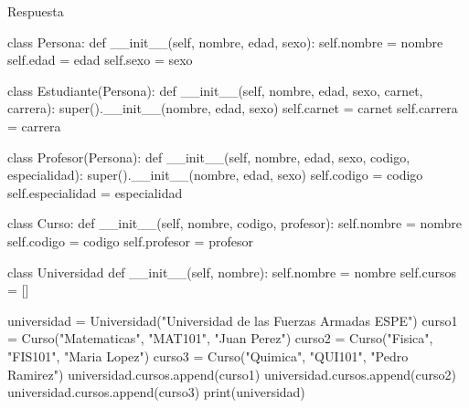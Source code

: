 \documentclass[
  a4paper,
  DIV=11,
  numbers=noendperiod,
  onepage,
  openany]{scrreprt}
\newenvironment{Shaded}{\begin{snugshade}}{\end{snugshade}}
\newcommand{\BuiltInTok}[1]{\textcolor[rgb]{0.00,0.23,0.31}{#1}}
\newcommand{\FunctionTok}[1]{\textcolor[rgb]{0.28,0.35,0.67}{#1}}
\newcommand{\KeywordTok}[1]{\textcolor[rgb]{0.00,0.23,0.31}{#1}}
\newcommand{\NormalTok}[1]{\textcolor[rgb]{0.00,0.23,0.31}{#1}}
\newcommand{\OperatorTok}[1]{\textcolor[rgb]{0.37,0.37,0.37}{#1}}
\newcommand{\StringTok}[1]{\textcolor[rgb]{0.13,0.47,0.30}{#1}}
\newcommand{\VariableTok}[1]{\textcolor[rgb]{0.07,0.07,0.07}{#1}}
\begin{document}
Respuesta

\begin{Shaded}
\begin{Highlighting}[]
\KeywordTok{class}\NormalTok{ Persona:}
    \KeywordTok{def} \FunctionTok{\_\_init\_\_}\NormalTok{(}\VariableTok{self}\NormalTok{, nombre, edad, sexo):}
        \VariableTok{self}\NormalTok{.nombre }\OperatorTok{=}\NormalTok{ nombre}
        \VariableTok{self}\NormalTok{.edad }\OperatorTok{=}\NormalTok{ edad}
        \VariableTok{self}\NormalTok{.sexo }\OperatorTok{=}\NormalTok{ sexo}

\KeywordTok{class}\NormalTok{ Estudiante(Persona):}
    \KeywordTok{def} \FunctionTok{\_\_init\_\_}\NormalTok{(}\VariableTok{self}\NormalTok{, nombre, edad, sexo, carnet, carrera):}
        \BuiltInTok{super}\NormalTok{().}\FunctionTok{\_\_init\_\_}\NormalTok{(nombre, edad, sexo)}
        \VariableTok{self}\NormalTok{.carnet }\OperatorTok{=}\NormalTok{ carnet}
        \VariableTok{self}\NormalTok{.carrera }\OperatorTok{=}\NormalTok{ carrera}

\KeywordTok{class}\NormalTok{ Profesor(Persona):}
    \KeywordTok{def} \FunctionTok{\_\_init\_\_}\NormalTok{(}\VariableTok{self}\NormalTok{, nombre, edad, sexo, codigo, especialidad):}
        \BuiltInTok{super}\NormalTok{().}\FunctionTok{\_\_init\_\_}\NormalTok{(nombre, edad, sexo)}
        \VariableTok{self}\NormalTok{.codigo }\OperatorTok{=}\NormalTok{ codigo}
        \VariableTok{self}\NormalTok{.especialidad }\OperatorTok{=}\NormalTok{ especialidad}

\KeywordTok{class}\NormalTok{ Curso:}
    \KeywordTok{def} \FunctionTok{\_\_init\_\_}\NormalTok{(}\VariableTok{self}\NormalTok{, nombre, codigo, profesor):}
        \VariableTok{self}\NormalTok{.nombre }\OperatorTok{=}\NormalTok{ nombre}
        \VariableTok{self}\NormalTok{.codigo }\OperatorTok{=}\NormalTok{ codigo}
        \VariableTok{self}\NormalTok{.profesor }\OperatorTok{=}\NormalTok{ profesor}

\KeywordTok{class}\NormalTok{ Universidad}
    \KeywordTok{def} \FunctionTok{\_\_init\_\_}\NormalTok{(}\VariableTok{self}\NormalTok{, nombre):}
        \VariableTok{self}\NormalTok{.nombre }\OperatorTok{=}\NormalTok{ nombre}
        \VariableTok{self}\NormalTok{.cursos }\OperatorTok{=}\NormalTok{ []}

\NormalTok{universidad }\OperatorTok{=}\NormalTok{ Universidad(}\StringTok{"Universidad de las Fuerzas Armadas ESPE"}\NormalTok{)}
\NormalTok{curso1 }\OperatorTok{=}\NormalTok{ Curso(}\StringTok{"Matematicas"}\NormalTok{, }\StringTok{"MAT101"}\NormalTok{, }\StringTok{"Juan Perez"}\NormalTok{)}
\NormalTok{curso2 }\OperatorTok{=}\NormalTok{ Curso(}\StringTok{"Fisica"}\NormalTok{, }\StringTok{"FIS101"}\NormalTok{, }\StringTok{"Maria Lopez"}\NormalTok{)}
\NormalTok{curso3 }\OperatorTok{=}\NormalTok{ Curso(}\StringTok{"Quimica"}\NormalTok{, }\StringTok{"QUI101"}\NormalTok{, }\StringTok{"Pedro Ramirez"}\NormalTok{)}
\NormalTok{universidad.cursos.append(curso1)}
\NormalTok{universidad.cursos.append(curso2)}
\NormalTok{universidad.cursos.append(curso3)}
\BuiltInTok{print}\NormalTok{(universidad)}


\end{Highlighting}
\end{Shaded}
\end{document}
